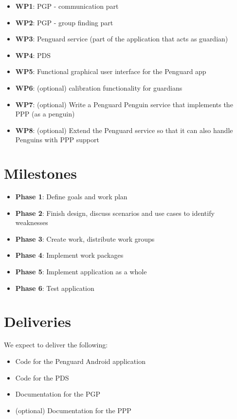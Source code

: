 \documentclass{report}
\begin{document}
\begin{itemize}
        \item {\bf WP1}: PGP - communication part
        \item {\bf WP2}: PGP - group finding part
        \item {\bf WP3}: Penguard service (part of the application that acts as guardian)
        \item {\bf WP4}: PDS
        \item {\bf WP5}: Functional graphical user interface for the Penguard app
        \item {\bf WP6}: (optional) calibration functionality for guardians
        \item {\bf WP7}: (optional) Write a Penguard Penguin service that implements the PPP (as a penguin)
        \item {\bf WP8}: (optional) Extend the Penguard service so that it can also handle Penguins with PPP support
\end{itemize}
 

\section{Milestones}

\begin{itemize}
    \item \textbf{Phase 1}: Define goals and work plan
    \item \textbf{Phase 2}: Finish design, discuss scenarios and use cases to identify weaknesses
    \item \textbf{Phase 3}: Create work, distribute work groups
    \item \textbf{Phase 4}: Implement work packages
    \item \textbf{Phase 5}: Implement application as a whole
    \item \textbf{Phase 6}: Test application
\end{itemize}




\section{Deliveries}

We expect to deliver the following:

\begin{itemize}
    \item Code for the Penguard Android application
    \item Code for the PDS
    \item Documentation for the PGP
    \item (optional) Documentation for the PPP
\end{itemize}
\end{document}
